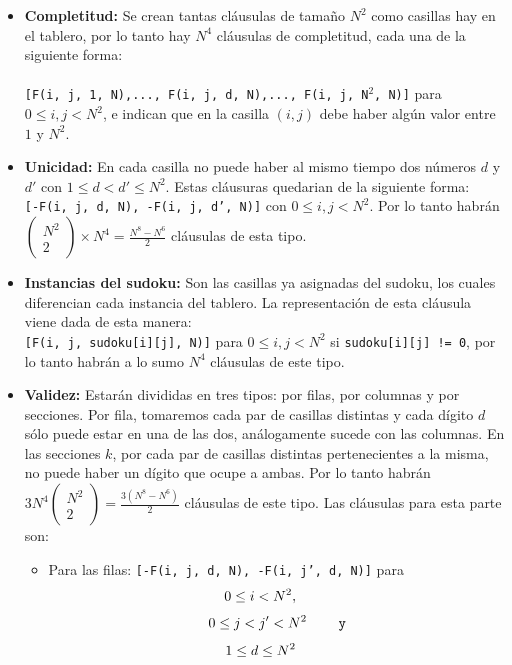 \documentclass[letterpaper,12pt]{article}
\begin{document}
\begin{itemize}
	\item \textbf{Completitud:} Se crean tantas cláusulas de tamaño $N^2$ como casillas hay en el tablero, por lo tanto hay $N^4$ cl\'ausulas de completitud, cada una de la siguiente forma: \\ \\ \texttt{[F(i, j, 1, N),..., F(i, j, d, N),..., F(i, j, N$^2$, N)]} para $0 \leq i,j < N^2$, e indican que en la casilla $(i, j)$ debe haber alg\'un valor entre $1$ y $N^2$.

	\item \textbf{Unicidad:} En cada casilla no puede haber al mismo tiempo dos n\'umeros $d$ y $d'$ con $1 \leq d < d' \leq N^2$. Estas cláusuras quedarian de la siguiente forma:\\ \texttt{[-F(i, j, d, N),  -F(i, j, d', N)]} con  $0 \leq i,j < N^2$. Por lo tanto habr\'an $\left( \begin{smallmatrix} N^2 \\ 2 \end{smallmatrix} \right) \times N^4 = \frac{N^8 - N^6}{2}$ cl\'ausulas de esta tipo.
	
	\item \textbf{Instancias del sudoku:} Son las casillas ya asignadas del sudoku, los cuales diferencian cada instancia del tablero. La representación de esta cláusula viene dada de esta manera:\\ \texttt{[F(i, j, sudoku[i][j], N)]} para $0 \leq i,j < N^2$ si \texttt{sudoku[i][j] != 0}, por lo tanto habr\'an a lo sumo $N^4$ cl\'ausulas de este tipo.

	\item \textbf{Validez:} Estarán divididas en tres tipos: por filas, por columnas y por secciones. Por fila, tomaremos cada par de casillas distintas y cada dígito $d$ sólo puede estar en una de las dos, análogamente sucede con las columnas. En las secciones $k$, por cada par de casillas distintas pertenecientes a la misma, no puede haber un dígito que ocupe a ambas. Por lo tanto habr\'an $3 N^4 \left( \begin{smallmatrix} N^2 \\ 2 \end{smallmatrix} \right) = \frac{3(N^8 - N^6)}{2}$ cl\'ausulas de este tipo. Las cláusulas para esta parte son:\\

	\begin{itemize}
		\item Para las filas:
\texttt{[-F(i, j, d, N),  -F(i, j', d, N)]} para 
$$0 \leq i < N^2, \hspace{0.8cm}$$
$$\hspace{0.4mm} 0 \leq j < j'< N^2 \hspace{0.8cm} \texttt{y}$$ 
$$1 \leq d \leq N^2 \hspace{0.8cm}$$\\
		

\end{itemize}
\end{itemize}
\end{document}
